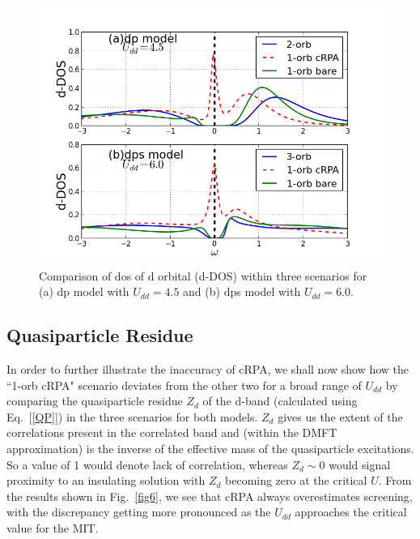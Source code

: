 \documentclass[10pt]{ruthesis}
\begin{document}
{\begin{figure}[H]
 \includegraphics[width=\columnwidth]{./plotForpublishing/doscmp_barecRPA.png}
 \caption{\label{fig5}Comparison of dos of d orbital (d-DOS) within three scenarios for (a) dp model with $U_{dd}=4.5 $ and (b) dps model with $U_{dd}=6.0$.}
\end{figure}



\subsection{Quasiparticle Residue}


In order to further illustrate the inaccuracy of cRPA, we shall now show how the ``1-orb cRPA" scenario deviates from the other two for a broad range of $U_{dd}$ by comparing the quasiparticle residue $Z_d$ of the d-band (calculated using Eq.~[\ref{QP}]) in the three scenarios for both models. $Z_d$ gives us the extent of the correlations present in the correlated band and (within the DMFT approximation) is the inverse of the effective mass of the quasiparticle excitations. So a value of 1 would denote lack of correlation, whereas $Z_d \sim 0$ would signal proximity to an insulating solution with $Z_d$ becoming zero at the critical $U$. From the results shown in Fig.~\ref{fig6}, we see that cRPA always overestimates screening, with the discrepancy getting more pronounced as the $U_{dd}$ approaches the critical value for the MIT. 


}
\end{document}
